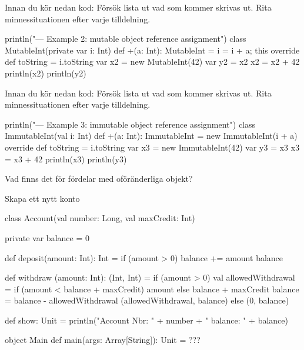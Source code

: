 \Subtask Innan du kör nedan kod: Försök lista ut vad som kommer skrivas ut. Rita minnessituationen efter varje tilldelning.

\begin{Code}
println("\n--- Example 2: mutable object reference assignment")
class MutableInt(private var i: Int) {
  def +(a: Int): MutableInt = { i = i + a; this }
  override def toString = i.toString
}
var x2 = new MutableInt(42)
var y2 = x2
x2 = x2 + 42
println(x2)
println(y2)
\end{Code}

\Subtask Innan du kör nedan kod: Försök lista ut vad som kommer skrivas ut. Rita minnessituationen efter varje tilldelning.

\begin{Code}
println("\n--- Example 3: immutable object reference assignment")
class ImmutableInt(val i: Int) {
  def +(a: Int): ImmutableInt = new ImmutableInt(i + a) 
  override def toString = i.toString
}
var x3 = new ImmutableInt(42)
var y3 = x3
x3 = x3 + 42
println(x3)
println(y3)
\end{Code}

\Subtask\Pen Vad finns det för fördelar med oföränderliga objekt?


\Task Skapa ett nytt konto

\ExtraTasks %

\Task 

\begin{Code}
class Account(val number: Long, val maxCredit: Int){ 
  private var balance = 0
  
  def deposit(amount: Int): Int = { 
    if (amount > 0) {balance += amount}
    balance
  }
  
  def withdraw	(amount: Int): (Int, Int) = if (amount > 0) { 
    val allowedWithdrawal = 
      if (amount < balance + maxCredit) amount 
      else balance + maxCredit 
    balance = balance - allowedWithdrawal
    (allowedWithdrawal, balance)
  } else (0, balance)
  
  def show: Unit = 
    println("Account Nbr: " + number + " balance: " + balance) 
}

object Main {
  def main(args: Array[String]): Unit = {
    ???
  }
}
\end{Code}

\AdvancedTasks %

\Task     
    